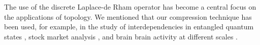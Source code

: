 \documentclass{amsart}
\begin{document}
	The use of the discrete Laplace-de Rham operator has become a central focus on the applications of topology. We mentioned that our compression technique has been used, for example, in the study of interdependencies in entangled quantum states \cite{physics}, stock market analysis \cite{stocks}, and brain brain activity at different scales \cite{brain}.



%
%
%
%
%

\end{document}
